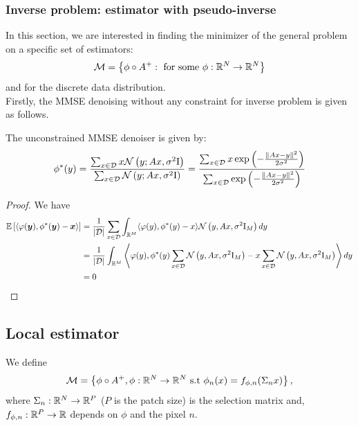 \documentclass[a4paper,10pt]{article}
\begin{document}
\subsubsection{Inverse problem: estimator with pseudo-inverse}
In this section, we are interested in finding the minimizer of the general problem  on a specific set of estimators:
\begin{equation*}
    \mathcal{M} = \left\{ \phi \circ A^+: \mbox{ for some } \phi: \mathbb{R}^N \to \mathbb{R}^N \right\}
\end{equation*}
and for the discrete data distribution. 
\\Firstly, the MMSE denoising without any constraint for inverse problem is given as follows.
\begin{proposition}
    The unconstrained MMSE denoiser is given by:
    \begin{equation}
        \phi^{*}(y) =  \frac{\sum_{x \in \mathcal{D}} x \mathcal{N}\left( {y; A x, \sigma^2 \mathrm{I}} \right)}{\sum_{x \in \mathcal{D}} \mathcal{N}\left( {y; A x, \sigma^2 \mathrm{I}} \right)} =   \frac{\sum_{x \in \mathcal{D}} x \exp \left( -\frac{\left\| A x - y \right \|^2}{2 \sigma^2} \right) }{\sum_{x \in \mathcal{D}}  \exp \left( -\frac{\left\| A x - y \right \|^2}{2 \sigma^2} \right) }
    \end{equation}
\end{proposition}
\begin{proof}
    We have
    \begin{align*}
        \mathbb{E} \left[ {\left\langle \varphi(\boldsymbol{y}), \phi^*(\boldsymbol{y}) - \boldsymbol{x} \right\rangle} \right] &=\frac{1}{|\mathcal{D}|}\sum_{x\in\mathcal{D}}\int_{\mathbb{R}^M} \langle \varphi(y), \phi^*(y)-x\rangle \mathcal{N}\left( {y,Ax,\sigma^2 \mathrm{I}_M} \right) dy\\
        &= \frac{1}{|\mathcal{D}|}\int_{\mathbb{R}^M} \left\langle \varphi(y), \phi^*(y) \sum_{x\in\mathcal{D}}\mathcal{N}\left( {y,Ax,\sigma^2 \mathrm{I}_M} \right)-x \sum_{x\in\mathcal{D}}\mathcal{N}\left( {y,Ax,\sigma^2 \mathrm{I}_M} \right)\right\rangle dy\\
        &=0
    \end{align*} 
\end{proof}

\subsection{Local estimator}
We define 
\begin{equation}
    \mathcal{M} = \left\{\phi \circ A^+, \phi: \mathbb{R}^N \to \mathbb{R}^N \mbox{ s.t } \phi_n(x) = f_{\phi,n}(\Sigma_n x)\right\},
\end{equation}
where $\Sigma_n : \mathbb{R}^N \to \mathbb{R}^P$ ($P$ is the patch size) is the selection matrix and, $f_{\phi, n} : \mathbb{R}^P \to \mathbb{R}$ depends on $\phi$ and the pixel $n$.
\end{document}
